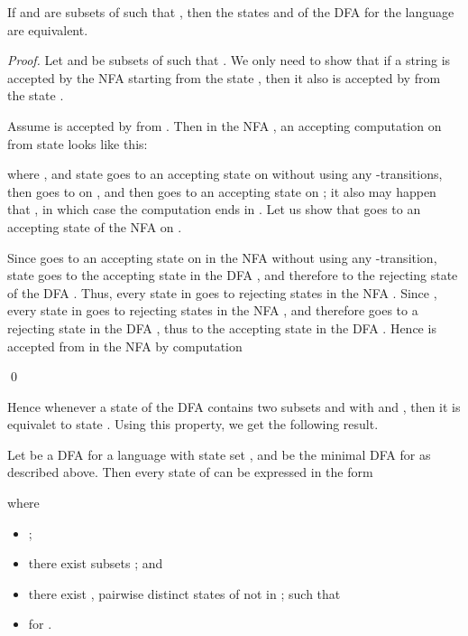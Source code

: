 \documentclass[runningheads]{llncs}
\begin{document}
\begin{lemma}\label{-----le1}
 If  and  are subsets of 
 such that ,
 then the states  and  of
 the DFA  for the language 
 are equivalent.
\end{lemma}

\begin{proof}
 Let  and  be subsets of 
 such that .
 We only need to show that
 if a string  is accepted by the NFA  starting from the state ,
 then it also is accepted by  from the state .

 Assume   is accepted  by  from .
 Then in the NFA , an accepting computation on  from state 
 looks like this:
 
 where , and
 state  goes to an accepting state  on  
 without using any -transitions,
 then  goes to  on ,
 and then  goes to an accepting state 
 on ; it also may happen that , in which case
 the computation ends in .
 Let us show that  goes to an accepting state of the NFA  on .

 Since  goes to an accepting state  on  in the NFA 
 without using any -transition,
 state  goes to the accepting state  in the DFA ,
 and therefore to the rejecting state  of the DFA .
 Thus, every state  in  goes to  rejecting states in the NFA .
 Since , every state in  goes to
 rejecting states in the NFA ,
 and therefore  goes to a rejecting state  in the DFA ,
 thus to the accepting state  in the DFA  .
 Hence  is accepted from  in the NFA 
 by computation
 
\qed
\end{proof}


Hence whenever a state  of the DFA 
contains two subsets  and  with  and ,
then it is equivalet to state .
Using this property, we get the following result.

\begin{lemma}\label{-----le2}\label{le:express}
 Let  be a DFA for a language  with state set ,
 and  be the minimal DFA for  as described above.
 Then every  state of 
 can be expressed in the form

where
 \begin{itemize}
 \item  ;
\item there exist subsets 
; and
\item there exist , pairwise distinct states of 
            not in ; such that
\item   for .
\end{itemize}
\end{lemma}
\end{document}
